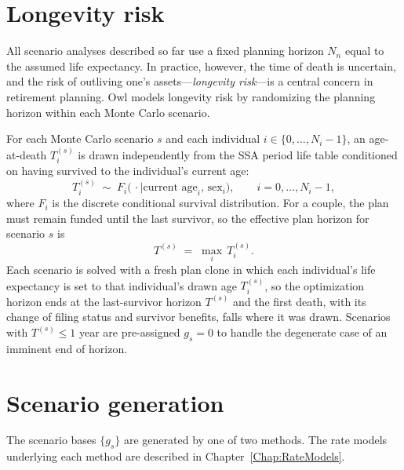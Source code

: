 \documentclass[fleqn,12pt]{report}
\begin{document}
\section{Longevity risk}
\label{sec:longevity}

All scenario analyses described so far use a fixed planning horizon $N_n$
equal to the assumed life expectancy.
In practice, however, the time of death is uncertain, and the risk of
outliving one's assets---\textit{longevity risk}---is a central concern in
retirement planning.
Owl models longevity risk by randomizing the planning horizon within each
Monte Carlo scenario.

For each Monte Carlo scenario $s$ and each individual $i \in \{0,\ldots,N_i-1\}$,
an age-at-death $T_i^{(s)}$ is drawn independently from the SSA period life
table conditioned on having survived to the individual's current age:
\begin{equation}
    \label{Eq:LongevityDraw}
    T_i^{(s)} \;\sim\; F_i\!\bigl(\,\cdot \mid \text{current age}_i,\, \text{sex}_i\bigr),
    \qquad i = 0, \ldots, N_i - 1,
\end{equation}
where $F_i$ is the discrete conditional survival distribution.
For a couple, the plan must remain funded until the last survivor, so the
effective plan horizon for scenario $s$ is
\begin{equation}
    \label{Eq:LastSurvivor}
    T^{(s)} \;=\; \max_i\, T_i^{(s)}.
\end{equation}
Each scenario is solved with a fresh plan clone in which each individual's life
expectancy is set to that individual's drawn age $T_i^{(s)}$, so the optimization
horizon ends at the last-survivor horizon $T^{(s)}$ and the first death, with
its change of filing status and survivor benefits, falls where it was drawn.
Scenarios with $T^{(s)} \leq 1$ year are pre-assigned $g_s = 0$ to
handle the degenerate case of an imminent end of horizon.

\section{Scenario generation}

The scenario bases $\{g_s\}$ are generated by one of two methods.
The rate models underlying each method are described in Chapter~\ref{Chap:RateModels}.
\end{document}
